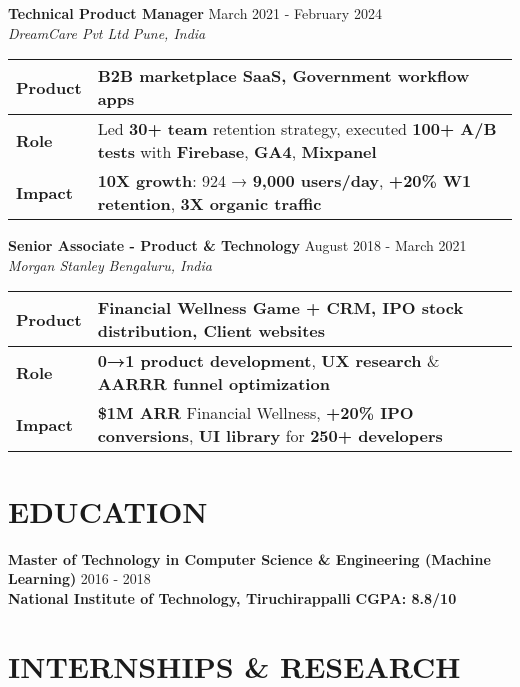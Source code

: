 \documentclass[10pt,a4paper]{article}
\newcommand{\experienceitem}[4]{
    \textbf{#1} \hfill #2 \\
    \textit{#3} \hfill \textit{#4}
}
\newcommand{\educationitem}[4]{
    \textbf{#1} \hfill #2 \\
    #3 \hfill #4
}
\begin{document}
\vspace{12pt}

\experienceitem{\textbf{Technical Product Manager}}{March 2021 - February 2024}{DreamCare Pvt Ltd}{Pune, India}

\begin{tabularx}{\textwidth}{|>{\raggedright\arraybackslash}p{1.8cm}|X|}
\hline
\textbf{Product} & \textbf{B2B marketplace SaaS}, Government \textbf{workflow apps} \\
\hline
\textbf{Role} & Led \textbf{30+ team} retention strategy, executed \textbf{100+ A/B tests} with \textbf{Firebase}, \textbf{GA4}, \textbf{Mixpanel} \\
\hline
\textbf{Impact} & \textbf{10X growth}: 924 → \textbf{9,000 users/day}, \textbf{+20\% W1 retention}, \textbf{3X organic traffic} \\
\hline
\end{tabularx}

\vspace{12pt}

\experienceitem{\textbf{Senior Associate - Product \& Technology}}{August 2018 - March 2021}{Morgan Stanley}{Bengaluru, India}

\begin{tabularx}{\textwidth}{|>{\raggedright\arraybackslash}p{1.8cm}|X|}
\hline
\textbf{Product} & \textbf{Financial Wellness} Game + \textbf{CRM}, \textbf{IPO} stock distribution, Client websites \\
\hline
\textbf{Role} & \textbf{0→1 product development}, \textbf{UX research} \& \textbf{AARRR funnel optimization} \\
\hline
\textbf{Impact} & \textbf{\$1M ARR} Financial Wellness, \textbf{+20\% IPO conversions}, \textbf{UI library} for \textbf{250+ developers} \\
\hline
\end{tabularx}

\section{EDUCATION}

\educationitem{\textbf{Master of Technology} in \textbf{Computer Science \& Engineering (Machine Learning)}}{2016 - 2018}{\textbf{National Institute of Technology, Tiruchirappalli}}{\textbf{CGPA: 8.8/10}}

\section{INTERNSHIPS \& RESEARCH}
\end{document}
